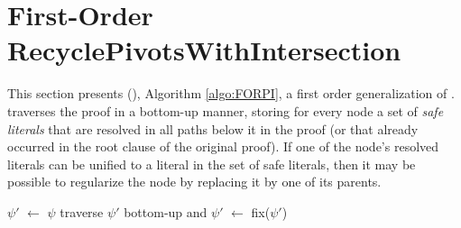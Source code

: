 \section{First-Order RecyclePivotsWithIntersection}
\label{sec:FORPI}
This section presents {\FirstOrderRPI} ({\FORPI}), Algorithm \ref{algo:FORPI}, a first order generalization of {\RPI}. 
{\FORPI} traverses the proof in a bottom-up manner, storing for every node a set of \emph{safe literals} that are resolved in all paths below it in the proof (or that already occurred in the root clause of the original proof). If one of the node's resolved literals can be unified to a literal in the set of safe literals, then it may be possible to regularize the node by replacing it by one of its parents. 


\newcommand{\la}{\leftarrow}


\begin{algorithm}[bt]
\begin{footnotesize}


\BlankLine

$\psi'$ $\la$ $\psi$\;
traverse $\psi'$ bottom-up and 
$\psi'$ $\la$ fix($\psi'$) \;
\;
\caption{\label{algo:FORPI} \texttt{\FORPI}}
\end{footnotesize}
\end{algorithm}





